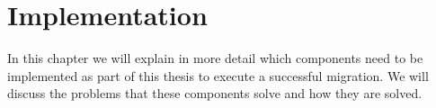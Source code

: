 %
\section{Implementation}
\label{sec:implementation}
%
In this chapter we will explain in more detail which components need to be implemented as part of this thesis to execute a successful migration. We will discuss the problems that these components solve and how they are solved.
%

